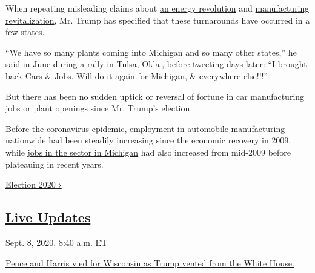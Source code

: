 When repeating misleading claims about
\href{https://www.nytimes3xbfgragh.onion/2020/01/08/us/politics/trump-fact-check.html}{an
energy revolution} and
\href{https://www.nytimes3xbfgragh.onion/2019/08/13/business/economy/donald-trump-jobs-created.html}{manufacturing
revitalization}, Mr. Trump has specified that these turnarounds have
occurred in a few states.

``We have so many plants coming into Michigan and so many other
states,'' he said in June during a rally in Tulsa, Okla., before
\href{https://twitter.com/realDonaldTrump/status/1275218587188449280}{tweeting
days later}: ``I brought back Cars \& Jobs. Will do it again for
Michigan, \& everywhere else!!!''

But there has been no sudden uptick or reversal of fortune in car
manufacturing jobs or plant openings since Mr. Trump's election.

Before the coronavirus epidemic,
\href{https://data.bls.gov/timeseries/CES3133600101?amp\%253bdata_tool=XGtable\&output_view=data\&include_graphs=true}{employment
in automobile manufacturing} nationwide had been steadily increasing
since the economic recovery in 2009, while
\href{https://data.bls.gov/timeseries/SMU26000003133610001?amp\%253bdata_tool=XGtable\&output_view=data\&include_graphs=true}{jobs
in the sector in Michigan} had also increased from mid-2009 before
plateauing in recent years.

\href{https://www.nytimes3xbfgragh.onion/news-event/2020-election}{Election
2020 ›}

\hypertarget{live-updates}{%
\subsection{\texorpdfstring{\href{https://www.nytimes3xbfgragh.onion/live/2020/09/08/us/trump-vs-biden}{Live
Updates}}{Live Updates}}\label{live-updates}}

\href{https://www.nytimes3xbfgragh.onion/live/2020/09/08/us/trump-vs-biden\#pence-and-harris-vied-for-wisconsin-as-trump-vented-from-the-white-house}{}

Sept. 8, 2020, 8:40 a.m. ET

\href{https://www.nytimes3xbfgragh.onion/live/2020/09/08/us/trump-vs-biden\#pence-and-harris-vied-for-wisconsin-as-trump-vented-from-the-white-house}{Pence
and Harris vied for Wisconsin as Trump vented from the White
House.}\href{https://www.nytimes3xbfgragh.onion/live/2020/09/08/us/trump-vs-biden\#with-labor-day-behind-them-the-campaigns-take-flight-literally}{}

